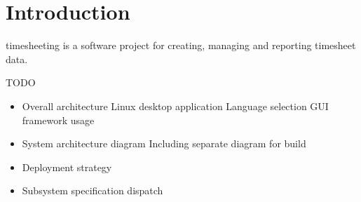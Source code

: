 \section{Introduction}
timesheeting is a software project for creating, managing and reporting
timesheet data.

TODO
\begin{itemize}
\item Overall architecture
  Linux desktop application
  Language selection
  GUI framework usage
\item System architecture diagram
  Including separate diagram for build
\item Deployment strategy
\item Subsystem specification dispatch
\end{itemize}